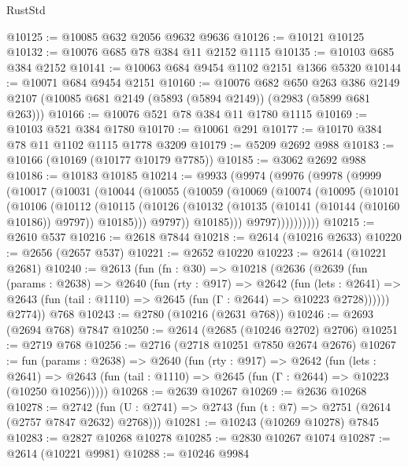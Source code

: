 \begin{lexlean}{RustStd}
\begin{coremodule}
@10125 := @10085 @632 @2056 @9632 @9636
@10126 := @10121 @10125
@10132 := @10076 @685 @78 @384 @11 @2152 @1115
@10135 := @10103 @685 @384 @2152
@10141 := @10063 @684 @9454 @1102 @2151 @1366 @5320
@10144 := @10071 @684 @9454 @2151
@10160 := @10076
    @682
    @650
    @263
    @386
    @2149
    @2107
    (@10085 @681 @2149 (@5893 (@5894 @2149)) (@2983 (@5899 @681 @263)))
@10166 := @10076 @521 @78 @384 @11 @1780 @1115
@10169 := @10103 @521 @384 @1780
@10170 := @10061 @291
@10177 := @10170 @384 @78 @11 @1102 @1115 @1778 @3209
@10179 := @5209 @2692 @988
@10183 := @10166 (@10169 (@10177 @10179 @7785))
@10185 := @3062 @2692 @988
@10186 := @10183 @10185
@10214 := @9933
    (@9974
      (@9976
        (@9978
          (@9999
            (@10017
              (@10031
                (@10044
                  (@10055
                    (@10059
                      (@10069
                        (@10074
                          (@10095
                            (@10101
                              (@10106
                                (@10112
                                  (@10115
                                    (@10126
                                      (@10132
                                        (@10135 (@10141 (@10144 (@10160 @10186)) @9797))
                                        @10185)))
                                  @9797))
                              @10185)))
                        @9797))))))))))
@10215 := @2610 @537
@10216 := @2618 @7844
@10218 := @2614 (@10216 @2633)
@10220 := @2656 (@2657 @537)
@10221 := @2652 @10220
@10223 := @2614 (@10221 @2681)
@10240 := @2613
    (fun (fn : @30) =>
    @10218
      (@2636
        (@2639
          (fun (params : @2638) =>
          @2640
            (fun (rty : @917) =>
            @2642
              (fun (lets : @2641) =>
              @2643 (fun (tail : @1110) => @2645 (fun (Γ : @2644) => @10223 @2728))))))
        @2774))
    @768
@10243 := @2780 (@10216 (@2631 @768))
@10246 := @2693 (@2694 @768) @7847
@10250 := @2614 (@2685 (@10246 @2702) @2706)
@10251 := @2719 @768
@10256 := @2716 (@2718 @10251 @7850 @2674 @2676)
@10267 := fun (params : @2638) =>
  @2640
    (fun (rty : @917) =>
    @2642
      (fun (lets : @2641) =>
      @2643 (fun (tail : @1110) => @2645 (fun (Γ : @2644) => @10223 (@10250 @10256)))))
@10268 := @2639 @10267
@10269 := @2636 @10268
@10278 := @2742 (fun (U : @2741) => @2743 (fun (t : @7) => @2751 (@2614 (@2757 @7847 @2632) @2768)))
@10281 := @10243 (@10269 @10278) @7845
@10283 := @2827 @10268 @10278
@10285 := @2830 @10267 @1074
@10287 := @2614 (@10221 @9981)
@10288 := @10246 @9984

\end{coremodule}
\end{lexlean}
